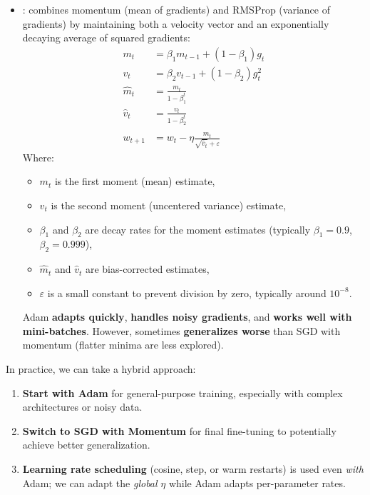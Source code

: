 \begin{itemize}
\begin{itemize}
        \item {}: combines momentum (mean of gradients) and RMSProp (variance of gradients) by maintaining both a velocity vector and an exponentially decaying average of squared gradients:
        \begin{equation}
            \begin{aligned}
                m_t &= \beta_1 m_{t-1} + (1 - \beta_1) g_t \\[.3em]
                v_t &= \beta_2 v_{t-1} + (1 - \beta_2) g_t^2 \\[.3em]
                \hat{m}_t &= \frac{m_t}{1 - \beta_1^t} \\[.3em]
                \hat{v}_t &= \frac{v_t}{1 - \beta_2^t} \\[.3em]
                w_{t+1} &= w_t - \eta \frac{\hat{m}_t}{\sqrt{\hat{v}_t} + \varepsilon}
            \end{aligned}
        \end{equation}
        Where:
        \begin{itemize}
            \item $m_t$ is the first moment (mean) estimate,
            \item $v_t$ is the second moment (uncentered variance) estimate,
            \item $\beta_1$ and $\beta_2$ are decay rates for the moment estimates (typically $\beta_1 = 0.9$, $\beta_2 = 0.999$),
            \item $\hat{m}_t$ and $\hat{v}_t$ are bias-corrected estimates,
            \item $\varepsilon$ is a small constant to prevent division by zero, typically around $10^{-8}$.
        \end{itemize}
        Adam \textbf{adapts quickly}, \textbf{handles noisy gradients}, and \textbf{works well with mini-batches}. However, sometimes \textbf{generalizes worse} than SGD with momentum (flatter minima are less explored).
    \end{itemize}
\end{itemize}
In practice, we can take a hybrid approach:
\begin{enumerate}
    \item \textbf{Start with Adam} for general-purpose training, especially with complex architectures or noisy data.
    \item \textbf{Switch to SGD with Momentum} for final fine-tuning to potentially achieve better generalization.
    \item \textbf{Learning rate scheduling} (cosine, step, or warm restarts) is used even \emph{with} Adam; we can adapt the \emph{global} $\eta$ while Adam adapts per-parameter rates.
\end{enumerate}
